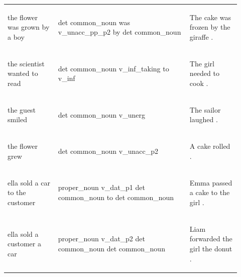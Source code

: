 \documentclass[11pt]{article}
\begin{document}
\begin{table}
\begin{tabular}{p{0.2\linewidth} p{0.52\linewidth} p{0.2\linewidth}}
\begin{small}the flower was grown by a boy\end{small} & \begin{small}det common\_noun was v\_unacc\_pp\_p2 by det common\_noun \end{small} & \begin{small}The cake was frozen by the giraffe .\end{small} \\
\begin{small}the scientist wanted to read\end{small} & \begin{small}det common\_noun v\_inf\_taking to v\_inf \end{small} & \begin{small}The girl needed to cook .\end{small} \\
\begin{small}the guest smiled\end{small} & \begin{small}det common\_noun v\_unerg \end{small} & \begin{small}The sailor laughed .\end{small} \\
\begin{small}the flower grew\end{small} & \begin{small}det common\_noun v\_unacc\_p2 \end{small} & \begin{small}A cake rolled .\end{small} \\
\begin{small}ella sold a car to the customer\end{small} & \begin{small}proper\_noun v\_dat\_p1 det common\_noun to det common\_noun \end{small} & \begin{small}Emma passed a cake to the girl .\end{small} \\
\begin{small}ella sold a customer a car\end{small} & \begin{small}proper\_noun v\_dat\_p2 det common\_noun det common\_noun \end{small} & \begin{small}Liam forwarded the girl the donut .\end{small} \\

\end{tabular}
\end{table}
\end{document}

